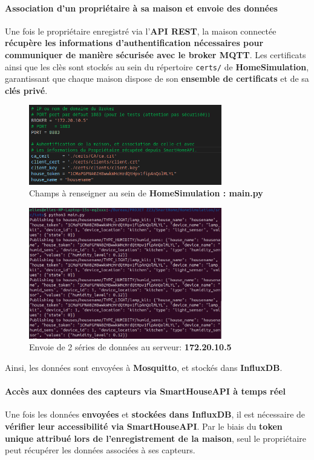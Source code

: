 \documentclass[10pt, a4paper]{report}
\begin{document}
	\paragraph{Association d'un propriétaire à sa maison et envoie des données}
		Une fois le propriétaire enregistré via l’\textbf{API REST}, la maison connectée \textbf{récupère les informations d’authentification nécessaires pour communiquer de manière sécurisée avec le broker MQTT}. Les certificats ainsi que les clès sont stockés au sein du répertoire \texttt{certs/} de \textbf{HomeSimulation}, garantissant que chaque maison dispose de son \textbf{ensemble de certificats} et de sa \textbf{clés privé}.
		
		\begin{figure}[h!]
			\centering
			\includegraphics[width=0.75\textwidth]{ressources/img/preuves/champsRenseignes}
			\caption{Champs à renseigner au sein de \textbf{HomeSimulation : main.py}}
			\label{fig:champsARenseigner}
		\end{figure}
		
		\begin{figure}[h!]
			\centering
			\includegraphics[width=0.75\textwidth]{ressources/img/preuves/envoieDonnesAPI}
			\caption{Envoie de 2 séries de données au serveur: \textbf{172.20.10.5}}
			\label{fig:envoieDonnees}
		\end{figure}
		Ainsi, les données sont envoyées à \textbf{Mosquitto}, et stockés dans \textbf{InfluxDB}.
	\paragraph{Accès aux données des capteurs via SmartHouseAPI à temps réel}
	Une fois les données \textbf{envoyées} et \textbf{stockées dans InfluxDB}, il est nécessaire de \textbf{vérifier leur accessibilité via SmartHouseAPI}. Par le biais du \textbf{token unique attribué lors de l’enregistrement de la maison}, seul le propriétaire peut récupérer les données associées à ses capteurs.\\
	
\end{document}
